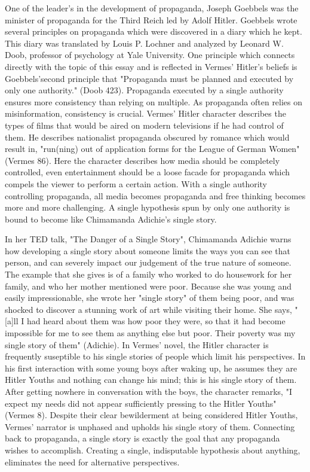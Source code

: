 \documentclass[12pt]{article}
\begin{document}
One of the leader's in the development of propaganda, Joseph Goebbels was the minister of propaganda for the
Third Reich led by Adolf Hitler. Goebbels wrote several principles on propaganda which were discovered in a
diary which he kept. This diary was translated by Louis P. Lochner and analyzed by Leonard W. Doob, professor of 
psychology at Yale University. One principle which connects directly with the topic of this essay and is
reflected in Vermes' Hitler's beliefs is Goebbels'second principle that "Propaganda must be planned and
executed by only one authority." (Doob 423). Propaganda executed by a single authority ensures more
consistency than relying on multiple. As propaganda often relies on misinformation, consistency is crucial.
Vermes' Hitler character describes the types of films that would be aired on modern televisions if he had control of 
them. He describes nationalist propaganda obscured by romance which would result in, "run(ning) out of application forms
for the League of German Women" (Vermes 86). Here the character describes how media should be completely controlled,
even entertainment should be a loose facade for propaganda which compels the viewer to perform a certain action.
With a single authority controlling propaganda, all media becomes propaganda and free thinking becomes more and more
challenging. A single hypothesis spun by only one authority is bound to become like Chimamanda Adichie's single story.

In her TED talk, "The Danger of a Single Story", Chimamanda Adichie warns how developing a single story about
someone limits the ways you can see that person, and can severely impact our judgement of the true nature of someone. 
The example that she gives is of a family who worked to do housework for her family, and who her mother mentioned were poor.
Because she was young and easily impressionable, she wrote her "single story" of them being poor, and was shocked to 
discover a stunning work of art while visiting their home. She says, "[a]ll I had heard about them was how poor they were,
so that it had become impossible for me to see them as anything else but poor.
Their poverty was my single story of them" (Adichie). In Vermes' novel, the Hitler character is frequently suseptible to
his single stories of people which limit his perspectives. In his first interaction with some young boys after waking up,
he assumes they are Hitler Youths and nothing can change his mind; this is his single story of them. After getting nowhere
in conversation with the boys, the character remarks, "I expect my needs did not appear sufficiently pressing to the 
Hitler Youths" (Vermes 8). Despite their clear bewilderment at being considered Hitler Youths, Vermes' narrator is unphased
and upholds his single story of them. Connecting back to propaganda, a single story is exactly the goal that any propaganda
wishes to accomplish. Creating a single, indisputable hypothesis about anything, eliminates the need for alternative perspectives.
\end{document}
